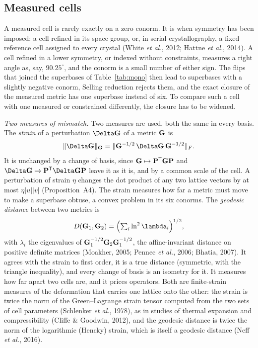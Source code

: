\subsection{Measured cells}
\label{sec:theory-measured}
A measured cell is rarely exactly on a zero conorm. It is when symmetry has been imposed: a cell refined in its space group, or, in serial crystallography, a fixed reference cell assigned to every crystal (White \emph{et al.}, 2012; Hattne \emph{et al.}, 2014). A cell refined in a lower symmetry, or indexed without constraints, measures a right angle as, say, $90.25^\circ$, and the conorm is a small number of either sign. The flips that joined the superbases of Table~\ref{tab:mono} then lead to superbases with a slightly negative conorm, Selling reduction rejects them, and the exact closure of the measured metric has one superbase instead of six. To compare such a cell with one measured or constrained differently, the closure has to be widened.

\emph{Two measures of mismatch.}\label{sec:strain} Two measures are used, both the same in every basis. The \emph{strain} of a perturbation $\Delta\Gmet$ of a metric $\Gmet$ is
\begin{equation}
\|\Delta\Gmet\|_{\Gmet}=\|\Gmet^{-1/2}\,\Delta\Gmet\,\Gmet^{-1/2}\|_F .
\label{eq:strain}
\end{equation}
It is unchanged by a change of basis, since $\Gmet\mapsto\Pop^{\mathsf T}\Gmet\Pop$ and $\Delta\Gmet\mapsto\Pop^{\mathsf T}\Delta\Gmet\Pop$ leave it as it is, and by a common scale of the cell. A perturbation of strain $\eta$ changes the dot product of any two lattice vectors by at most $\eta|u||v|$ (Proposition~A4). The strain measures how far a metric must move to make a superbase obtuse, a convex problem in its six conorms. The \emph{geodesic distance} between two metrics is
\begin{equation}
\dist(\Gmet_1,\Gmet_2)=\Bigl(\sum_i \ln^2\lambda_i\Bigr)^{1/2},
\label{eq:geo}
\end{equation}
with $\lambda_i$ the eigenvalues of $\Gmet_1^{-1/2}\Gmet_2\Gmet_1^{-1/2}$, the affine-invariant distance on positive definite matrices (Moakher, 2005; Pennec \emph{et al.}, 2006; Bhatia, 2007). It agrees with the strain to first order, it is a true distance (symmetric, with the triangle inequality), and every change of basis is an isometry for it. It measures how far apart two cells are, and it prices operators. Both are finite-strain measures of the deformation that carries one lattice onto the other: the strain is twice the norm of the Green--Lagrange strain tensor computed from the two sets of cell parameters (Schlenker \emph{et al.}, 1978), as in studies of thermal expansion and compressibility (Cliffe \& Goodwin, 2012), and the geodesic distance is twice the norm of the logarithmic (Hencky) strain, which is itself a geodesic distance (Neff \emph{et al.}, 2016).

